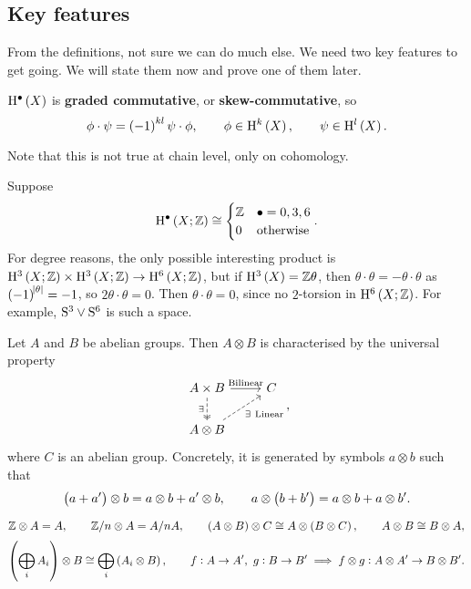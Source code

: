 \pagebreak

\subsection{Key features}

From the definitions, not sure we can do much else. We need two key features to get going. We will state them now and prove one of them later.

\begin{proposition}
$ \H^\bullet\br{X} $ is \textbf{graded commutative}, or \textbf{skew-commutative}, so
$$ \phi \cdot \psi = \br{-1}^{kl}\psi \cdot \phi, \qquad \phi \in \H^k\br{X}, \qquad \psi \in \H^l\br{X}. $$
\end{proposition}

Note that this is not true at chain level, only on cohomology.

\begin{example*}
Suppose
$$ \H^\bullet\br{X; \ZZ} \cong
\begin{cases}
\ZZ & \bullet = 0, 3, 6 \\
0 & \text{otherwise}
\end{cases}.
$$
For degree reasons, the only possible interesting product is $ \H^3\br{X; \ZZ} \times \H^3\br{X; \ZZ} \to \H^6\br{X; \ZZ} $, but if $ \H^3\br{X} = \ZZ\theta $, then $ \theta \cdot \theta = -\theta \cdot \theta $ as $ \br{-1}^{\abs{\theta}} = -1 $, so $ 2\theta \cdot \theta = 0 $. Then $ \theta \cdot \theta = 0 $, since no $ 2 $-torsion in $ \H^6\br{X; \ZZ} $. For example, $ \S^3 \vee \S^6 $ is such a space.
\end{example*}

Let $ A $ and $ B $ be abelian groups. Then $ A \otimes B $ is characterised by the universal property
$$
\begin{tikzcd}
A \times B \arrow{r}{\text{Bilinear}} \arrow[twoheadrightarrow, dashed]{d}[swap]{\exists} & C \\
A \otimes B \arrow[dashed]{ur}[swap]{\exists \ \text{Linear}} &
\end{tikzcd},
$$
where $ C $ is an abelian group. Concretely, it is generated by symbols $ a \otimes b $ such that
$$ \br{a + a'} \otimes b = a \otimes b + a' \otimes b, \qquad a \otimes \br{b + b'} = a \otimes b + a \otimes b'. $$

\begin{example*}
$$ \ZZ \otimes A = A, \qquad \ZZ / n \otimes A = A / nA, \qquad \br{A \otimes B} \otimes C \cong A \otimes \br{B \otimes C}, \qquad A \otimes B \cong B \otimes A, $$
$$ \br{\bigoplus_i A_i} \otimes B \cong \bigoplus_i \br{A_i \otimes B}, \qquad f : A \to A', \ g : B \to B' \implies f \otimes g : A \otimes A' \to B \otimes B'. $$
\end{example*}

